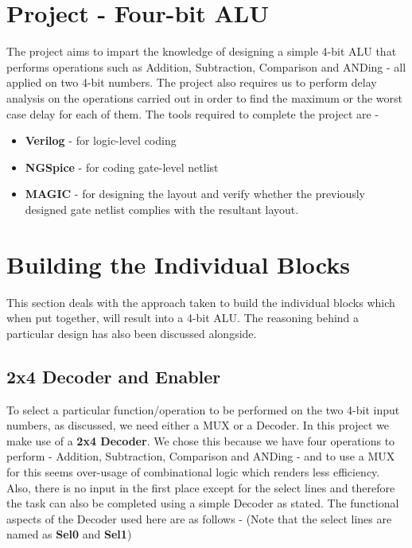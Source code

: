 \documentclass[a4paper, titlepage]{article}
\begin{document}
\section{Project - Four-bit ALU}
The project aims to impart the knowledge of designing a simple 4-bit ALU that performs operations 
such as Addition, Subtraction, Comparison and ANDing - all applied on two 4-bit numbers. The project
also requires us to perform delay analysis on the operations carried out in order to find 
the maximum or the worst case delay for each of them.\newline 
The tools required to complete the project are - 
\begin{itemize}
    \item \textbf{Verilog} - for logic-level coding 
    \item \textbf{NGSpice} - for coding gate-level netlist
    \item \textbf{MAGIC} - for designing the layout and verify whether the previously designed gate
    netlist complies with the resultant layout.
\end{itemize}

\section{Building the Individual Blocks}
This section deals with the approach taken to build the individual blocks which 
when put together, will result into a 4-bit ALU. The reasoning behind a particular design has also been
discussed alongside.
\subsection{2x4 Decoder and Enabler}
To select a particular function/operation to be performed on the two 4-bit input 
numbers, as discussed, we need either a MUX or a Decoder. \newline
In this project we make use of a \textbf{2x4 Decoder}. We chose this because we have four operations to
perform - Addition, Subtraction, Comparison and ANDing - and to use a MUX for this seems over-usage of 
combinational logic which renders less efficiency. Also, there is no input in the first place except for 
the select lines and therefore the task can also be completed using a simple Decoder as stated. \newline
The functional aspects of the Decoder used here are as follows - 
(Note that the select lines are named as \textbf{Sel0} and \textbf{Sel1})
\end{document}
